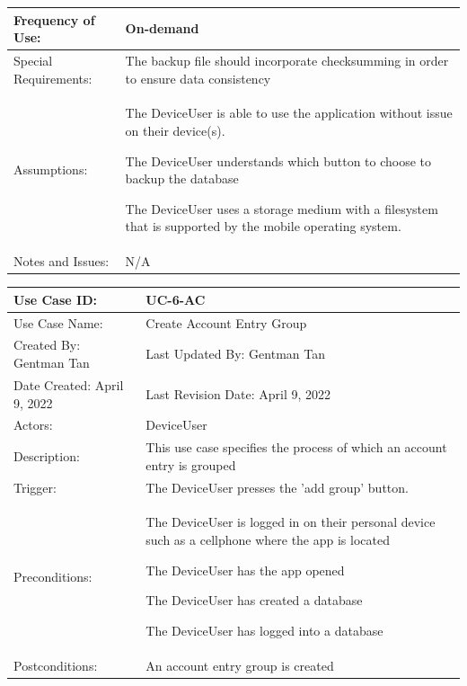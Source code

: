 \documentclass[stu]{apa7}
\newcommand{\nextitem}{\par\hspace*{\labelsep}\textbullet\hspace*{\labelsep}}
\begin{document}
{\begin{xltabular}{\textwidth}{|l|X|}
  Frequency of Use: & On-demand \\ \hline

  Special Requirements: & \nextitem The backup file should incorporate checksumming in order to ensure data consistency \\ \hline

  Assumptions: & \nextitem The DeviceUser is able to use the application without issue on their device(s). \nextitem The DeviceUser understands which button to choose to backup the database \nextitem The DeviceUser uses a storage medium with a filesystem that is supported by the mobile operating system. \\ \hline

  Notes and Issues: & N/A \\ \hline

\end{xltabular}

\scriptsize{\begin{xltabular}{\textwidth}{|l|X|}
  \hline Use Case ID: & UC-6-AC \\ \hline

  Use Case Name: & Create Account Entry Group \\ \hline

  Created By: Gentman Tan & Last Updated By: Gentman Tan\\ \hline

  Date Created: April 9, 2022 & Last Revision Date: April 9, 2022 \\ \hline

  Actors: & \nextitem DeviceUser \\ \hline

  Description: & This use case specifies the process of which an account entry is grouped \\ \hline

  Trigger: & The DeviceUser presses the 'add group' button. \\ \hline

  Preconditions: & \nextitem The DeviceUser is logged in on their personal device such as a cellphone where the app is located \nextitem The DeviceUser has the app opened \nextitem The DeviceUser has created a database \nextitem The DeviceUser has logged into a database \\ \hline

  Postconditions: & \nextitem An account entry group is created \\ \hline


\end{xltabular}}}
\end{document}
